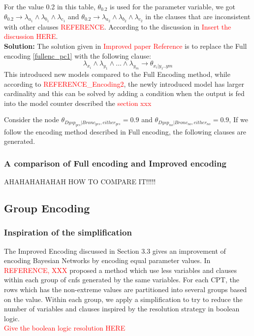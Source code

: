 \begin{itemize}
For the value 0.2 in this table, $\theta_{0.2}$ is used for the parameter variable, we got $ \theta_{0.2} \rightarrow \lambda_{a_{1}} \wedge \lambda_{b_{1}} \wedge \lambda_{c_{1}}$ and $ \theta_{0.2} \rightarrow \lambda_{a_{2}} \wedge \lambda_{b_{2}} \wedge \lambda_{c_{2}}$ in the clauses that are inconsistent with other clauses \textcolor{red}{REFERENCE}. According to the discussion in \textcolor{red}{Insert the discussion HERE}.\\
\textbf{Solution:} The solution given in \textcolor{red}{Improved paper Reference} is to replace the Full encoding \ref{fullenc_pc1} with the following clause:
\begin{equation}\label{improvedenc_pc}
    \lambda_{x_{i}} \wedge \lambda_{y_{1}} \wedge... \wedge \lambda_{y_{m}} \rightarrow \theta_{x_{i}|y_{1}..y{m}}
\end{equation}
This introduced new models compared to the Full Encoding method, while according to \textcolor{red}{REFERENCE\_Encoding2}, the newly introduced model has larger cardinality and this can be solved by adding a condition when the output is fed into the model counter described the \textcolor{red}{section xxx}
\end{itemize}

Consider the node $\theta_{Dysp_{yes}|Bronc_{yes},either_{yes}} = 0.9$ and $\theta_{Dysp_{no}|Bronc_{no},either_{no}} = 0.9$, 
If we follow the encoding method described in Full encoding, the following clauses are generated.

\subsubsection{A comparison of Full encoding and Improved encoding}
AHAHAHAHAHAH HOW TO COMPARE IT!!!!!



\subsection{Group Encoding}
\subsubsection{Inspiration of the simplification}
The Improved Encoding discussed in Section 3.3 gives an improvement of encoding Bayesian Networks by encoding equal parameter values. In \textcolor{red}{REFERENCE, XXX} proposed a method which use less variables and clauses within each group of cnfs generated by the same variables. %
For each CPT, the rows which has the non-extreme values are partitioned into several groups based on the value. Within each group, we apply a simplification to try to reduce the number of variables and clauses inspired by the resolution strategy in boolean logic.\\
\textcolor{red}{Give the boolean logic resolution HERE}

